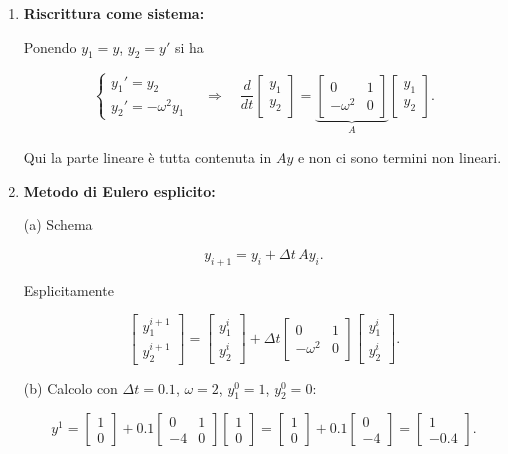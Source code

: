 \documentclass[12pt,a4paper]{article}
\begin{document}
\begin{enumerate}
\item \textbf{Riscrittura come sistema:}

Ponendo \( y_1 = y \), \( y_2 = y' \) si ha

\[
\begin{cases}
y_1' = y_2 \\
y_2' = -\omega^2 y_1
\end{cases}
\quad \Rightarrow \quad
\frac{d}{dt} \begin{bmatrix} y_1 \\ y_2 \end{bmatrix} 
= \underbrace{\begin{bmatrix} 0 & 1 \\ -\omega^2 & 0 \end{bmatrix}}_{A}
\begin{bmatrix} y_1 \\ y_2 \end{bmatrix}.
\]

Qui la parte lineare è tutta contenuta in \( A y \) e non ci sono termini non lineari.

\item \textbf{Metodo di Eulero esplicito:}

(a) Schema

\[
y_{i+1} = y_i + \Delta t \, A y_i.
\]

Esplicitamente

\[
\begin{bmatrix} y_1^{i+1} \\ y_2^{i+1} \end{bmatrix}
= \begin{bmatrix} y_1^i \\ y_2^i \end{bmatrix} + \Delta t
\begin{bmatrix} 0 & 1 \\ -\omega^2 & 0 \end{bmatrix}
\begin{bmatrix} y_1^i \\ y_2^i \end{bmatrix}.
\]

(b) Calcolo con \(\Delta t=0.1\), \(\omega=2\), \(y_1^0=1\), \(y_2^0=0\):

\[
y^1 = \begin{bmatrix} 1 \\ 0 \end{bmatrix} + 0.1
\begin{bmatrix} 0 & 1 \\ -4 & 0 \end{bmatrix}
\begin{bmatrix} 1 \\ 0 \end{bmatrix}
= \begin{bmatrix} 1 \\ 0 \end{bmatrix} + 0.1 \begin{bmatrix} 0 \\ -4 \end{bmatrix} 
= \begin{bmatrix} 1 \\ -0.4 \end{bmatrix}.
\]


\end{enumerate}
\end{document}
